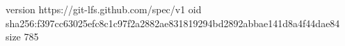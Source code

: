 version https://git-lfs.github.com/spec/v1
oid sha256:f397cc63025efc8c1c97f2a2882ae831819294bd2892abbae141d8a4f44dae84
size 785

